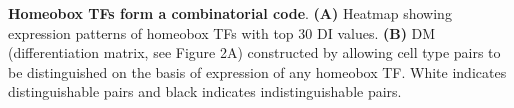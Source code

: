 \textbf{Homeobox TFs form a combinatorial code}.  
\textbf{(A)} Heatmap showing expression patterns of homeobox TFs with top 30 DI values. \textbf{(B)} DM (differentiation matrix, see Figure 2A) constructed by allowing cell type pairs to be distinguished on the basis of expression of any homeobox TF. White indicates distinguishable pairs and black indicates indistinguishable pairs. 